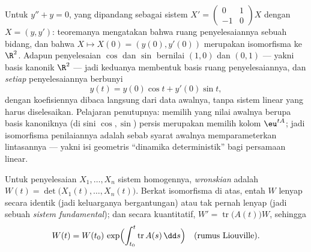 \begin{example}\label{ex:b2:diffeq:evaliso}
Untuk $y'' + y = 0$, yang dipandang sebagai sistem $X' =
\begin{pmatrix} 0 & 1\\ -1 & 0\end{pmatrix}X$ dengan $X = (y,
y')$: teoremanya mengatakan bahwa ruang penyelesaiannya sebuah bidang, dan bahwa
$X \mapsto X(0) = (y(0), y'(0))$ merupakan isomorfisma ke
$\R^2$. Adapun penyelesaian $\cos$ dan $\sin$ bernilai $(1, 0)$
dan $(0, 1)$ --- yakni basis kanonik $\R^2$ --- jadi keduanya membentuk
basis ruang penyelesaiannya, dan \emph{setiap} penyelesaiannya berbunyi
\[
y(t) = y(0)\cos t + y'(0)\sin t ,
\]
dengan koefisiennya dibaca langsung dari data awalnya, tanpa
sistem linear yang harus diselesaikan. Pelajaran penutupnya: memilih
 yang nilai awalnya berupa basis
kanoniknya (di sini $\cos, \sin$) persis merupakan memilih kolom
$\eu^{tA}$; jadi isomorfisma penilaiannya adalah sebab syarat
awalnya memparameterkan lintasannya --- yakni isi geometris
``dinamika deterministik'' bagi persamaan linear.
\end{example}

\begin{definition}[Wronskian]\label{def:b2:diffeq:wronskian}
Untuk penyelesaian $X_1, \dots, X_n$ sistem homogennya,
\emph{wronskian} adalah $W(t) = \det\bigl(X_1(t),
\dots, X_n(t)\bigr)$. Berkat isomorfisma di atas, entah $W$ lenyap
secara identik (jadi keluarganya bergantungan) atau tak pernah lenyap (jadi sebuah \emph{sistem
fundamental}); dan secara kuantitatif, $W' = \operatorname{tr}\bigl(A(t)\bigr)
W$, sehingga
\[
W(t) = W(t_0)\,\exp\Bigl(\int_{t_0}^{t}
\operatorname{tr} A(s)\,\dd s\Bigr)
\quad \text{(rumus Liouville)}.
\]
\end{definition}

